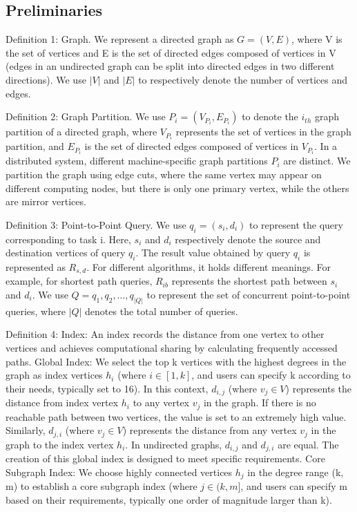 \documentclass[lettersize,journal]{IEEEtran} %
\begin{document}
\subsection{Preliminaries}
Definition 1: Graph. We represent a directed graph as $G=(V,E)$, where V is the set of vertices and E is the set of directed edges composed of vertices in V (edges in an undirected graph can be split into directed edges in two different directions). We use $|V|$ and $|E|$ to respectively denote the number of vertices and edges.

Definition 2: Graph Partition. We use $P_i=(V_{P_i},E_{P_i})$ to denote the $i_{th}  $ graph partition of a directed graph, where $V_{P_i}$ represents the set of vertices in the graph partition, and $E_{P_i}$ is the set of directed edges composed of vertices in $V_{P_i}$. In a distributed system, different machine-specific graph partitions $P_i$ are distinct. We partition the graph using edge cuts, where the same vertex may appear on different computing nodes, but there is only one primary vertex, while the others are mirror vertices.

Definition 3: Point-to-Point Query. We use $q_i=(s_i,d_i)$ to represent the query corresponding to task i. Here, $s_i$ and $d_i$ respectively denote the source and destination vertices of query $q_i$. The result value obtained by query $q_i$ is represented as $R_{s,d}$. For different algorithms, it holds different meanings. For example, for shortest path queries, $R_{ib}$ represents the shortest path between $s_i$ and $d_i$. We use $Q={q_1,q_2,\ldots,q_{|Q|}}$ to represent the set of concurrent point-to-point queries, where $|Q|$ denotes the total number of queries.

Definition 4: Index: An index records the distance from one vertex to other vertices and achieves computational sharing by calculating frequently accessed paths. Global Index: We select the top k vertices with the highest degrees in the graph as index vertices $h_i$ (where $i\in [1, k]$, and users can specify k according to their needs, typically set to 16). In this context, $d_{i,j}$ (where $v_j\in V$) represents the distance from index vertex $h_i$ to any vertex $v_j$ in the graph. If there is no reachable path between two vertices, the value is set to an extremely high value. Similarly, $d_{j,i}$ (where $v_j\in V$) represents the distance from any vertex $v_j$ in the graph to the index vertex $h_i$. In undirected graphs, $d_{i,j}$ and $d_{j,i}$ are equal. The creation of this global index is designed to meet specific requirements. Core Subgraph Index: We choose highly connected vertices $h_j$ in the degree range (k, m) to establish a core subgraph index (where $j\in (k, m]$, and users can specify m based on their requirements, typically one order of magnitude larger than k).
\end{document}
